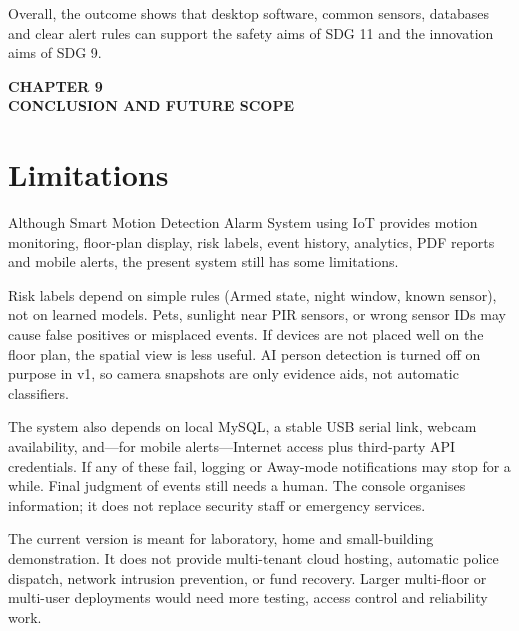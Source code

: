\documentclass[12pt,a4paper]{report}
\begin{document}
Overall, the outcome shows that desktop software, common sensors, databases and clear alert rules can support the safety aims of SDG 11 and the innovation aims of SDG 9.



\cleardoublepage
\thispagestyle{empty}

\null
\vfill

\begin{center}
    {\fontsize{16pt}{18pt}\selectfont\bfseries
    CHAPTER 9}\\[0.5cm]

    {\fontsize{16pt}{18pt}\selectfont\bfseries
    CONCLUSION AND FUTURE SCOPE}
\end{center}

\vfill
\null

\clearpage

\section{Limitations}

Although Smart Motion Detection Alarm System using IoT provides motion monitoring, floor-plan display, risk labels, event history, analytics, PDF reports and mobile alerts, the present system still has some limitations.

Risk labels depend on simple rules (Armed state, night window, known sensor), not on learned models. Pets, sunlight near PIR sensors, or wrong sensor IDs may cause false positives or misplaced events. If devices are not placed well on the floor plan, the spatial view is less useful. AI person detection is turned off on purpose in v1, so camera snapshots are only evidence aids, not automatic classifiers.

The system also depends on local MySQL, a stable USB serial link, webcam availability, and---for mobile alerts---Internet access plus third-party API credentials. If any of these fail, logging or Away-mode notifications may stop for a while. Final judgment of events still needs a human. The console organises information; it does not replace security staff or emergency services.

The current version is meant for laboratory, home and small-building demonstration. It does not provide multi-tenant cloud hosting, automatic police dispatch, network intrusion prevention, or fund recovery. Larger multi-floor or multi-user deployments would need more testing, access control and reliability work.
\end{document}
